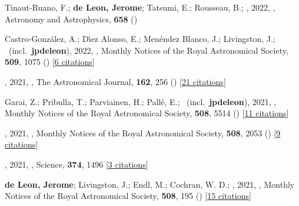 \item[{\color{numcolor}\scriptsize159}] Tinaut-Ruano, F.; \textbf{de Leon, Jerome}; Tatsumi, E.; Rousseau, B.; \etal, 2022, , Astronomy and Astrophysics, \textbf{658} ()

\item[{\color{numcolor}\scriptsize158}] Castro-Gonz{\'a}lez, A.; D{\'\i}ez Alonso, E.; Men{\'e}ndez Blanco, J.; Livingston, J.; \etal\ (incl.\ \textbf{jpdeleon}), 2022, , Monthly Notices of the Royal Astronomical Society, \textbf{509}, 1075 () [\href{https://ui.adsabs.harvard.edu/abs/2022MNRAS.509.1075C}{6 citations}]

\item[{\color{numcolor}\scriptsize157}] , 2021, , The Astronomical Journal, \textbf{162}, 256 () [\href{https://ui.adsabs.harvard.edu/abs/2021AJ....162..256W}{21 citations}]

\item[{\color{numcolor}\scriptsize156}] Garai, Z.; Pribulla, T.; Parviainen, H.; Pall{\'e}, E.; \etal\ (incl.\ \textbf{jpdeleon}), 2021, , Monthly Notices of the Royal Astronomical Society, \textbf{508}, 5514 () [\href{https://ui.adsabs.harvard.edu/abs/2021MNRAS.508.5514G}{11 citations}]

\item[{\color{numcolor}\scriptsize155}] , 2021, , Monthly Notices of the Royal Astronomical Society, \textbf{508}, 2053 () [\href{https://ui.adsabs.harvard.edu/abs/2021MNRAS.508.2053T}{9 citations}]

\item[{\color{numcolor}\scriptsize154}] , 2021, , Science, \textbf{374}, 1496 [\href{https://ui.adsabs.harvard.edu/abs/2021Sci...374.1496C}{3 citations}]

\item[{\color{numcolor}\scriptsize153}] \textbf{de Leon, Jerome}; Livingston, J.; Endl, M.; Cochran, W. D.; \etal, 2021, , Monthly Notices of the Royal Astronomical Society, \textbf{508}, 195 () [\href{https://ui.adsabs.harvard.edu/abs/2021MNRAS.508..195D}{15 citations}]

